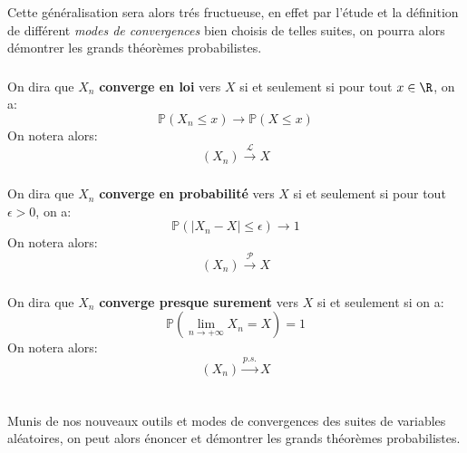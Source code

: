 Cette généralisation sera alors trés fructueuse, en effet par l'étude et la définition de différent \textit{modes de convergences} bien choisis de telles suites, on pourra alors démontrer les grands théorèmes probabilistes.

\subsection*{}
On dira que \(X_n\) \textbf{converge en loi} vers \(X\) si et seulement si pour tout \(x \in \R\), on a:
\[
   \mathbb{P}(X_n \leq x) \longrightarrow \mathbb{P}(X \leq x)
\]
On notera alors:
\[
   (X_n) \overset{\mathcal{L}}{\longrightarrow} X
\]

\subsection*{}
On dira que \(X_n\) \textbf{converge en probabilité} vers \(X\) si et seulement si pour tout \(\epsilon > 0\), on a:
\[
   \mathbb{P}(|X_n - X| \leq \epsilon) \longrightarrow 1
\]
On notera alors:
\[
   (X_n) \overset{\mathcal{P}}{\longrightarrow} X
\]

\subsection*{}
On dira que \(X_n\) \textbf{converge presque surement} vers \(X\) si et seulement si on a:
\[
   \mathbb{P}\left(\lim_{n \rightarrow +\infty} X_n = X \right) = 1
\]
On notera alors:
\[
   (X_n) \overset{p.s.}{\longrightarrow} X
\]

\subsection*{}

\chapter*{} %

Munis de nos nouveaux outils et modes de convergences des suites de variables aléatoires, on peut alors énoncer et démontrer les grands théorèmes probabilistes.

